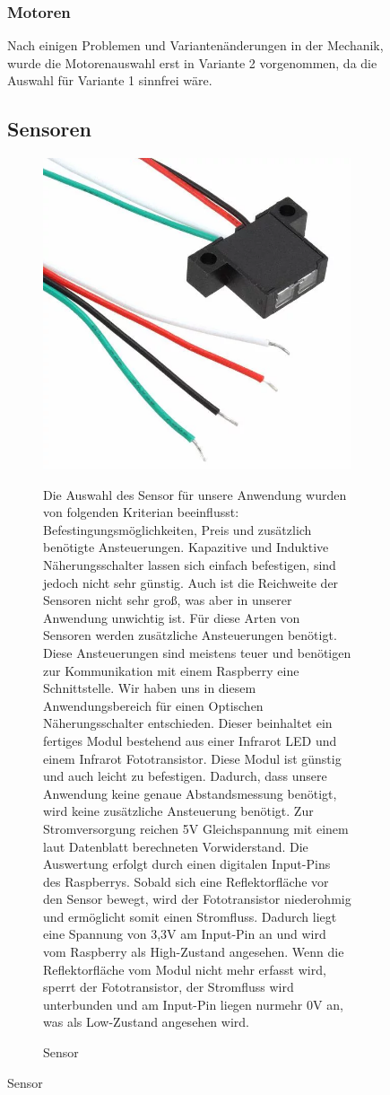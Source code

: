 \begin{figure}[H]
\begin{center}
\subsubsection{Motoren}
Nach einigen Problemen und Variantenänderungen in der Mechanik, wurde die Motorenauswahl erst in Variante 2 vorgenommen, da die Auswahl für Variante 1 sinnfrei wäre.

\subsection{Sensoren}
\begin{figure}[H] 
\begin{center}

\includegraphics[width=10cm]{Bilder/Bauteile/Sensor}
\caption{Sensor}
\label{Sensor}
Die Auswahl des Sensor für unsere Anwendung wurden von folgenden Kriterian beeinflusst: Befestingungsmöglichkeiten, Preis und zusätzlich benötigte Ansteuerungen.
Kapazitive und Induktive Näherungsschalter lassen sich einfach befestigen, sind jedoch nicht sehr günstig. Auch ist die Reichweite der Sensoren nicht sehr groß, was aber in unserer Anwendung unwichtig ist. Für diese Arten von Sensoren werden zusätzliche Ansteuerungen benötigt. Diese Ansteuerungen sind meistens teuer und benötigen zur Kommunikation mit einem Raspberry eine Schnittstelle.
Wir haben uns in diesem Anwendungsbereich für einen Optischen Näherungsschalter entschieden. Dieser beinhaltet ein fertiges Modul bestehend aus einer Infrarot LED und einem Infrarot Fototransistor. Diese Modul ist günstig und auch leicht zu befestigen. Dadurch, dass unsere Anwendung keine genaue Abstandsmessung benötigt, wird keine zusätzliche Ansteuerung benötigt. Zur Stromversorgung reichen 5V Gleichspannung mit einem laut Datenblatt berechneten Vorwiderstand. Die Auswertung erfolgt durch einen digitalen Input-Pins des Raspberrys. Sobald sich eine Reflektorfläche vor den Sensor bewegt, wird der Fototransistor niederohmig und ermöglicht somit einen Stromfluss. Dadurch liegt eine Spannung von 3,3V am Input-Pin an und wird vom Raspberry als High-Zustand angesehen. Wenn die Reflektorfläche vom Modul nicht mehr erfasst wird, sperrt der Fototransistor, der Stromfluss wird unterbunden und am Input-Pin liegen nurmehr 0V an, was als Low-Zustand angesehen wird.


\end{center}
\end{figure}
\end{center}
\end{figure}

